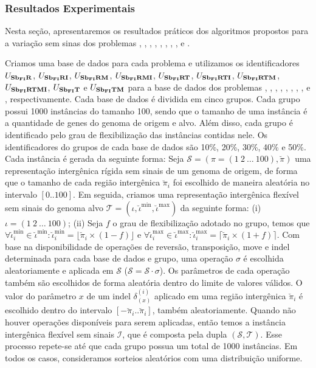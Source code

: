 \subsubsection{Resultados Experimentais}\label{subsubsection:PWLZZAVH}

Nesta seção, apresentaremos os resultados práticos dos algoritmos propostos para a variação sem sinas dos problemas \SbFIR{}, \SbFIRI{}, \SbFIRM{}, \SbFIRMI{}, \SbFIRT{}, \SbFIRTI{}, \SbFIRTM{}, \SbFIRTMI{}, \SbFIT{} e \SbFITM{}.

Criamos uma base de dados para cada problema e utilizamos os identificadores $U_{\textbf{Sb\textsubscript{FI}R}}{}$, $U_{\textbf{Sb\textsubscript{FI}RI}}{}$, $U_{\textbf{Sb\textsubscript{FI}RM}}{}$, $U_{\textbf{Sb\textsubscript{FI}RMI}}{}$, $U_{\textbf{Sb\textsubscript{FI}RT}}{}$, $U_{\textbf{Sb\textsubscript{FI}RTI}}{}$, $U_{\textbf{Sb\textsubscript{FI}RTM}}{}$, $U_{\textbf{Sb\textsubscript{FI}RTMI}}{}$, $U_{\textbf{Sb\textsubscript{FI}T}}{}$ e \break$U_{\textbf{Sb\textsubscript{FI}TM}}{}$ para a base de dados dos problemas \SbFIR{}, \SbFIRI{}, \SbFIRM{}, \SbFIRMI{}, \SbFIRT{}, \SbFIRTI{}, \SbFIRTM{}, \SbFIRTMI{}, \SbFIT{} e \SbFITM{}, respectivamente. Cada base de dados é dividida em cinco grupos. Cada grupo possui 1000 instâncias do tamanho 100, sendo que o tamanho de uma instância é a quantidade de genes do genoma de origem e alvo. Além disso, cada grupo é identificado pelo grau de flexibilização das instâncias contidas nele. Os identificadores do grupos de cada base de dados são 10\%, 20\%, 30\%, 40\% e 50\%. Cada instância é gerada da seguinte forma: Seja $\mathcal{S} = (\pi =(1~2~\dots~100),\breve\pi)$ uma representação intergênica rígida sem sinais de um genoma de origem, de forma que o tamanho de cada região intergênica $\breve\pi_i$ foi escolhido de maneira aleatória no intervalo $[0..100]$. Em seguida, criamos uma representação intergênica flexível sem sinais do genoma alvo $\mathcal{T} = (\iota, \breve\iota^{\min},\breve\iota^{\max})$ da seguinte forma: (i) $\iota =(1~2~\dots~100)$; (ii) Seja $f$ o grau de flexibilização adotado no grupo, temos que $\forall \breve\iota^{\min}_i \in \breve\iota^{\min}: \breve\iota^{\min}_i = \lfloor\breve\pi_i \times (1 - f)\rfloor$ e $\forall \breve\iota^{\max}_i \in \breve\iota^{\max} : \breve\iota^{\max}_i = \lceil\breve\pi_i \times (1 + f)\rceil$. Com base na disponibilidade de operações de reversão, transposição, move e indel determinada para cada base de dados e grupo, uma operação $\sigma$ é escolhida aleatoriamente e aplicada em $\mathcal{S}$ ($\mathcal{S} = \mathcal{S} \cdot \sigma$). Os parâmetros de cada operação também são escolhidos de forma aleatória dentro do limite de valores válidos. O valor do parâmetro $x$ de um indel $\delta^{(i)}_{(x)}$ aplicado em uma região intergênica $\breve\pi_{i}$ é escolhido dentro do intervalo $[-\breve\pi_{i}..\breve\pi_{i}]$, também aleatoriamente. Quando não houver operações disponíveis para serem aplicadas, então temos a instância intergênica flexível sem sinais $\mathcal{I}$, que é composta pela dupla $(\mathcal{S},\mathcal{T})$. Esse processo repete-se até que cada grupo possua um total de 1000 instâncias. Em todos os casos, consideramos sorteios aleatórios com uma distribuição uniforme.

